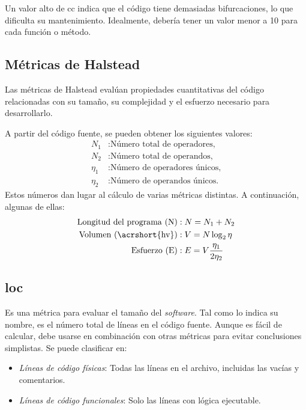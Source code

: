 Un valor alto de \gls{cc} indica que el código tiene demasiadas bifurcaciones, lo que dificulta su mantenimiento. Idealmente, debería tener un valor menor a 10 para cada función o método.

\subsection{Métricas de Halstead}

Las métricas de Halstead \citep{halstead1977metrics} evalúan propiedades cuantitativas del código relacionadas con su tamaño, su complejidad y el esfuerzo necesario para desarrollarlo.

A partir del código fuente, se pueden obtener los siguientes valores: \begin{align*}
    N_1&: \text{Número total de operadores,} \\  
    N_2&: \text{Número total de operandos,} \\ 
    \eta_1&: \text{Número de operadores únicos,} \\
    \eta_2&: \text{Número de operandos únicos.}
\end{align*}
Estos números dan lugar al cálculo de varias métricas distintas. A continuación, algunas de ellas: \begin{align*}
    \text{Longitud del programa (N)}&: N = N_1 + N_2 \\
    \text{Volumen (\acrshort{hv})}&: V = N \log_2\eta \\
    \text{Esfuerzo (E)}&:E = V \frac{\eta_1}{2 \eta_2}
\end{align*}

\subsection[Líneas de código (LOC, Lines Of Code)]{
   \Gls{loc}
}

Es una métrica para evaluar el tamaño del \emph{software}. Tal como lo indica su nombre, es el número total de líneas en el código fuente. Aunque es fácil de calcular, debe usarse en combinación con otras métricas para evitar conclusiones simplistas. Se puede clasificar en:

\begin{itemize}
    \item \emph{Líneas de código físicas}: Todas las líneas en el archivo, incluidas las vacías y comentarios.  
    \item \emph{Líneas de código funcionales}: Solo las líneas con lógica ejecutable.
\end{itemize}

